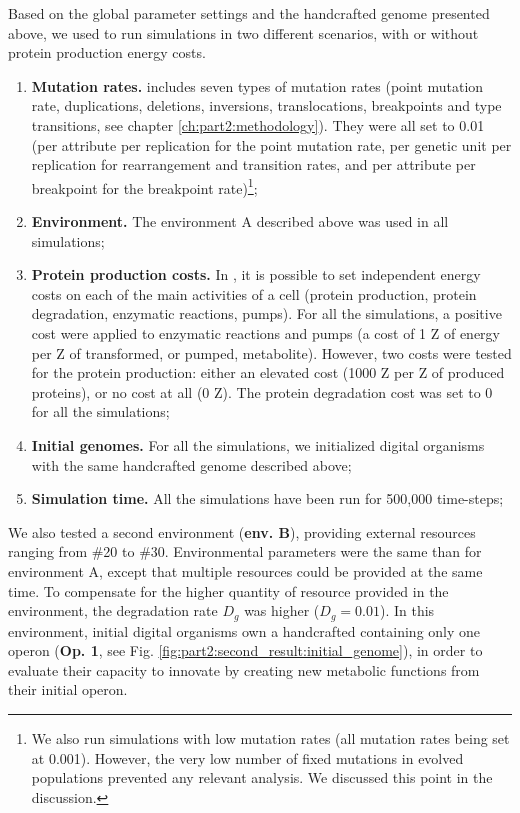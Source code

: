 Based on the global parameter settings and the handcrafted genome presented above, we used {\EvoEvoSim} to run simulations in two different scenarios, with or without protein production energy costs.
\begin{enumerate}
\item[\textbf{(1)}] \textbf{Mutation rates.} {\EvoEvoSim} includes seven types of mutation rates (point mutation rate, duplications, deletions, inversions, translocations, breakpoints and type transitions, see chapter \ref{ch:part2:methodology}). They were all set to 0.01 (per attribute per replication for the point mutation rate, per genetic unit per replication for rearrangement and transition rates, and per attribute per breakpoint for the breakpoint rate)\footnote{We also run simulations with low mutation rates (all mutation rates being set at 0.001). However, the very low number of fixed mutations in evolved populations prevented any relevant analysis. We discussed this point in the discussion.};
\item[\textbf{(2)}] \textbf{Environment.}
The environment A described above was used in all simulations;
\item[\textbf{(3)}] \textbf{Protein production costs.}
In {\EvoEvoSim}, it is possible to set independent energy costs on each of the main activities of a cell (protein production, protein degradation, enzymatic reactions, pumps). For all the simulations, a positive cost were applied to enzymatic reactions and pumps (a cost of 1 Z of energy per Z of transformed, or pumped, metabolite). However, two costs were tested for the protein production: either an elevated cost (1000 Z per Z of produced proteins), or no cost at all (0 Z). The protein degradation cost was set to 0 for all the simulations;
\item[\textbf{(4)}] \textbf{Initial genomes.}
For all the simulations, we initialized digital organisms with the same handcrafted genome described above;
\item[\textbf{(5)}] \textbf{Simulation time.}
All the simulations have been run for 500,000 time-steps;
\end{enumerate}

We also tested a second environment (\textbf{env. B}), providing external resources ranging from \#20 to \#30. Environmental parameters were the same than for environment A, except that multiple resources could be provided at the same time. To compensate for the higher quantity of resource provided in the environment, the degradation rate $D_g$ was higher ($D_g=0.01$). In this environment, initial digital organisms own a handcrafted containing only one operon (\textbf{Op. 1}, see Fig. \ref{fig:part2:second_result:initial_genome}), in order to evaluate their capacity to innovate by creating new metabolic functions from their initial operon.

